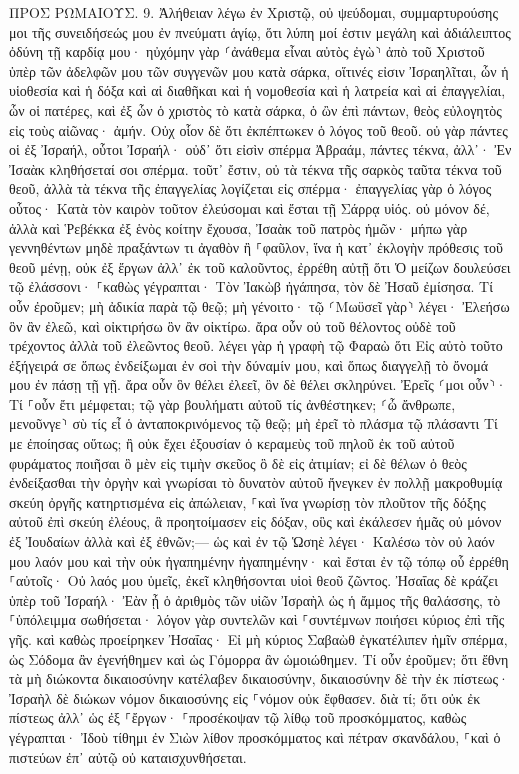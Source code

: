 \documentclass[twoside, 9pt]{extreport}
\begin{document}
ΠΡΟΣ ΡΩΜΑΙΟΥΣ.
9.
Ἀλήθειαν λέγω ἐν Χριστῷ, οὐ ψεύδομαι, συμμαρτυρούσης μοι τῆς συνειδήσεώς μου ἐν πνεύματι ἁγίῳ, 
ὅτι λύπη μοί ἐστιν μεγάλη καὶ ἀδιάλειπτος ὀδύνη τῇ καρδίᾳ μου· 
ηὐχόμην γὰρ ⸂ἀνάθεμα εἶναι αὐτὸς ἐγὼ⸃ ἀπὸ τοῦ Χριστοῦ ὑπὲρ τῶν ἀδελφῶν μου τῶν συγγενῶν μου κατὰ σάρκα, 
οἵτινές εἰσιν Ἰσραηλῖται, ὧν ἡ υἱοθεσία καὶ ἡ δόξα καὶ αἱ διαθῆκαι καὶ ἡ νομοθεσία καὶ ἡ λατρεία καὶ αἱ ἐπαγγελίαι, 
ὧν οἱ πατέρες, καὶ ἐξ ὧν ὁ χριστὸς τὸ κατὰ σάρκα, ὁ ὢν ἐπὶ πάντων, θεὸς εὐλογητὸς εἰς τοὺς αἰῶνας· ἀμήν. 
Οὐχ οἷον δὲ ὅτι ἐκπέπτωκεν ὁ λόγος τοῦ θεοῦ. οὐ γὰρ πάντες οἱ ἐξ Ἰσραήλ, οὗτοι Ἰσραήλ· 
οὐδ᾽ ὅτι εἰσὶν σπέρμα Ἀβραάμ, πάντες τέκνα, ἀλλ᾽· Ἐν Ἰσαὰκ κληθήσεταί σοι σπέρμα. 
τοῦτ᾽ ἔστιν, οὐ τὰ τέκνα τῆς σαρκὸς ταῦτα τέκνα τοῦ θεοῦ, ἀλλὰ τὰ τέκνα τῆς ἐπαγγελίας λογίζεται εἰς σπέρμα· 
ἐπαγγελίας γὰρ ὁ λόγος οὗτος· Κατὰ τὸν καιρὸν τοῦτον ἐλεύσομαι καὶ ἔσται τῇ Σάρρᾳ υἱός. 
οὐ μόνον δέ, ἀλλὰ καὶ Ῥεβέκκα ἐξ ἑνὸς κοίτην ἔχουσα, Ἰσαὰκ τοῦ πατρὸς ἡμῶν· 
μήπω γὰρ γεννηθέντων μηδὲ πραξάντων τι ἀγαθὸν ἢ ⸀φαῦλον, ἵνα ἡ κατ᾽ ἐκλογὴν πρόθεσις τοῦ θεοῦ μένῃ, 
οὐκ ἐξ ἔργων ἀλλ᾽ ἐκ τοῦ καλοῦντος, ἐρρέθη αὐτῇ ὅτι Ὁ μείζων δουλεύσει τῷ ἐλάσσονι· 
⸀καθὼς γέγραπται· Τὸν Ἰακὼβ ἠγάπησα, τὸν δὲ Ἠσαῦ ἐμίσησα. 
Τί οὖν ἐροῦμεν; μὴ ἀδικία παρὰ τῷ θεῷ; μὴ γένοιτο· 
τῷ ⸂Μωϋσεῖ γὰρ⸃ λέγει· Ἐλεήσω ὃν ἂν ἐλεῶ, καὶ οἰκτιρήσω ὃν ἂν οἰκτίρω. 
ἄρα οὖν οὐ τοῦ θέλοντος οὐδὲ τοῦ τρέχοντος ἀλλὰ τοῦ ἐλεῶντος θεοῦ. 
λέγει γὰρ ἡ γραφὴ τῷ Φαραὼ ὅτι Εἰς αὐτὸ τοῦτο ἐξήγειρά σε ὅπως ἐνδείξωμαι ἐν σοὶ τὴν δύναμίν μου, καὶ ὅπως διαγγελῇ τὸ ὄνομά μου ἐν πάσῃ τῇ γῇ. 
ἄρα οὖν ὃν θέλει ἐλεεῖ, ὃν δὲ θέλει σκληρύνει. 
Ἐρεῖς ⸂μοι οὖν⸃· Τί ⸀οὖν ἔτι μέμφεται; τῷ γὰρ βουλήματι αὐτοῦ τίς ἀνθέστηκεν; 
⸂ὦ ἄνθρωπε, μενοῦνγε⸃ σὺ τίς εἶ ὁ ἀνταποκρινόμενος τῷ θεῷ; μὴ ἐρεῖ τὸ πλάσμα τῷ πλάσαντι Τί με ἐποίησας οὕτως; 
ἢ οὐκ ἔχει ἐξουσίαν ὁ κεραμεὺς τοῦ πηλοῦ ἐκ τοῦ αὐτοῦ φυράματος ποιῆσαι ὃ μὲν εἰς τιμὴν σκεῦος ὃ δὲ εἰς ἀτιμίαν; 
εἰ δὲ θέλων ὁ θεὸς ἐνδείξασθαι τὴν ὀργὴν καὶ γνωρίσαι τὸ δυνατὸν αὐτοῦ ἤνεγκεν ἐν πολλῇ μακροθυμίᾳ σκεύη ὀργῆς κατηρτισμένα εἰς ἀπώλειαν, 
⸀καὶ ἵνα γνωρίσῃ τὸν πλοῦτον τῆς δόξης αὐτοῦ ἐπὶ σκεύη ἐλέους, ἃ προητοίμασεν εἰς δόξαν, 
οὓς καὶ ἐκάλεσεν ἡμᾶς οὐ μόνον ἐξ Ἰουδαίων ἀλλὰ καὶ ἐξ ἐθνῶν;— 
ὡς καὶ ἐν τῷ Ὡσηὲ λέγει· Καλέσω τὸν οὐ λαόν μου λαόν μου καὶ τὴν οὐκ ἠγαπημένην ἠγαπημένην· 
καὶ ἔσται ἐν τῷ τόπῳ οὗ ἐρρέθη ⸀αὐτοῖς· Οὐ λαός μου ὑμεῖς, ἐκεῖ κληθήσονται υἱοὶ θεοῦ ζῶντος. 
Ἠσαΐας δὲ κράζει ὑπὲρ τοῦ Ἰσραήλ· Ἐὰν ᾖ ὁ ἀριθμὸς τῶν υἱῶν Ἰσραὴλ ὡς ἡ ἄμμος τῆς θαλάσσης, τὸ ⸀ὑπόλειμμα σωθήσεται· 
λόγον γὰρ συντελῶν καὶ ⸀συντέμνων ποιήσει κύριος ἐπὶ τῆς γῆς. 
καὶ καθὼς προείρηκεν Ἠσαΐας· Εἰ μὴ κύριος Σαβαὼθ ἐγκατέλιπεν ἡμῖν σπέρμα, ὡς Σόδομα ἂν ἐγενήθημεν καὶ ὡς Γόμορρα ἂν ὡμοιώθημεν. 
Τί οὖν ἐροῦμεν; ὅτι ἔθνη τὰ μὴ διώκοντα δικαιοσύνην κατέλαβεν δικαιοσύνην, δικαιοσύνην δὲ τὴν ἐκ πίστεως· 
Ἰσραὴλ δὲ διώκων νόμον δικαιοσύνης εἰς ⸀νόμον οὐκ ἔφθασεν. 
διὰ τί; ὅτι οὐκ ἐκ πίστεως ἀλλ᾽ ὡς ἐξ ⸀ἔργων· ⸀προσέκοψαν τῷ λίθῳ τοῦ προσκόμματος, 
καθὼς γέγραπται· Ἰδοὺ τίθημι ἐν Σιὼν λίθον προσκόμματος καὶ πέτραν σκανδάλου, ⸀καὶ ὁ πιστεύων ἐπ᾽ αὐτῷ οὐ καταισχυνθήσεται. 
\end{document}
